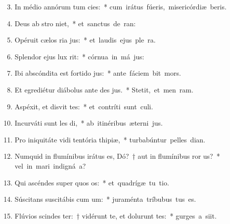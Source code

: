 \begin{flushleft}
\begin{enumerate}[leftmargin=*]
\setcounter{enumi}{2}

\item In médio annórum tum cies:~* \mbox{cum irátus fúeris, misericórdiæ beris.}
\item Deus ab stro niet,~* \mbox{et sanctus de  ran:}
\item Opéruit cælos ria jus:~* \mbox{et laudis ejus ple  ra.}
\item Splendor ejus  lux rit:~* \mbox{córnua in má jus:}
\item Ibi abscóndita est fortido jus:~* \mbox{ante fáciem  bit mors.}
\item Et egrediétur diábolus ante des jus.~* \mbox{Stetit, et men  ram.}
\item Aspéxit, et disvit tes:~* \mbox{et contríti sunt  culi.}
\item Incurváti sunt les di,~* \mbox{ab itinéribus æterni jus.}
\item Pro iniquitáte vidi tentória thipiæ,~* \mbox{turbabúntur pelles  dian.}
\item Numquid in flumínibus irátus es, Dó?~† aut in flumínibus ror us?~* \mbox{vel in mari indigná a?}
\item Qui ascéndes super quos os:~* \mbox{et quadrígæ tu tio.}
\item Súscitans suscitábis cum um:~* \mbox{juraménta tríbubus  tus es.}
\item Flúvios scindes ter:~† vidérunt te, et dolurunt tes:~* \mbox{gurges a siit.}

\end{enumerate}
\end{flushleft}
